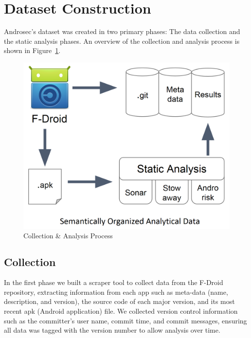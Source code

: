 \documentclass[journal,transmag]{IEEEtran}
\begin{document}
\section{Dataset Construction}
\label{sec: datasetconstruction}
Androsec's dataset was created in two primary phases: The data collection and the static analysis phases. An overview of the collection and analysis process is shown in Figure~\ref{fig:ap}.

\begin{figure}[tbph]
\centering
\vspace{-0.2cm}
\includegraphics[scale=.18]{./images/process.png}


\caption{Collection \& Analysis Process}
\vspace{-0.2cm}
\label{fig:ap}
\end{figure}

\subsection{Collection}
In the first phase we built a scraper tool to collect data from the F-Droid repository, extracting information from each app such as meta-data (name, description, and version), the source code of each major version, and its most recent apk (Android application) file. We collected version control information such as the committer's user name, commit time, and commit messages, ensuring all data was tagged with the version number to allow analysis over time.
\end{document}
